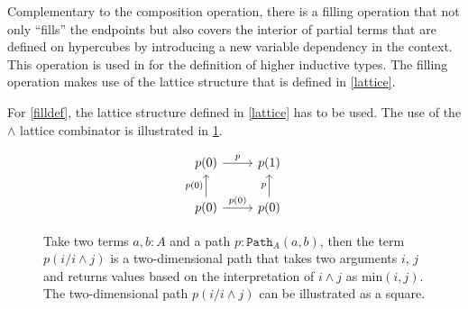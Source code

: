 \documentclass[12pt,a4paper,twoside,xetex]{book}
\newcommand{\op}[1]{\mathtt{#1}}
\newcommand{\pa}[3]{\op{Path}_{#1}\left(#2, #3\right)}
\begin{document}
Complementary to the composition operation, there is a filling operation that 
not only ``fills'' the endpoints but also covers the interior of partial terms 
that are defined on hypercubes by introducing a new variable dependency in the 
context. This operation is used in \cite{Coquand2018} for the definition of 
higher inductive types. The filling operation makes use of the lattice 
structure that is defined in \cref{lattice}. 


% 
% 
%  
% 
%  
%  

% 
% 
% 
% 

For \cref{filldef}, the lattice structure defined in \cref{lattice} has to be 
used. The use of the $\wedge$ lattice combinator is illustrated in 
\cref{twopath}.

\begin{figure}\label{twopath}
\centering
\[ \begin{tikzcd}
p (0) \arrow[r, "p" ] 
& p(1)  \\
p(0) 	\arrow[u, "p(0)"]	
	\arrow[r, "p(0)"]
& p(0)  \arrow[u, "p"] 
\end{tikzcd}
\]
\caption{Take two terms $a,b:A$ and a path $p : \pa{A}{a}{b}$, then the term 
$p(i/i\wedge j)$ is a two-dimensional path that takes two arguments $i$, $j$ 
and returns values based on the interpretation of $i \wedge j$ as 
$\text{min}(i,j)$. The two-dimensional path $p(i/i\wedge j)$ can be 
illustrated as a square.}
\end{figure}
\end{document}
